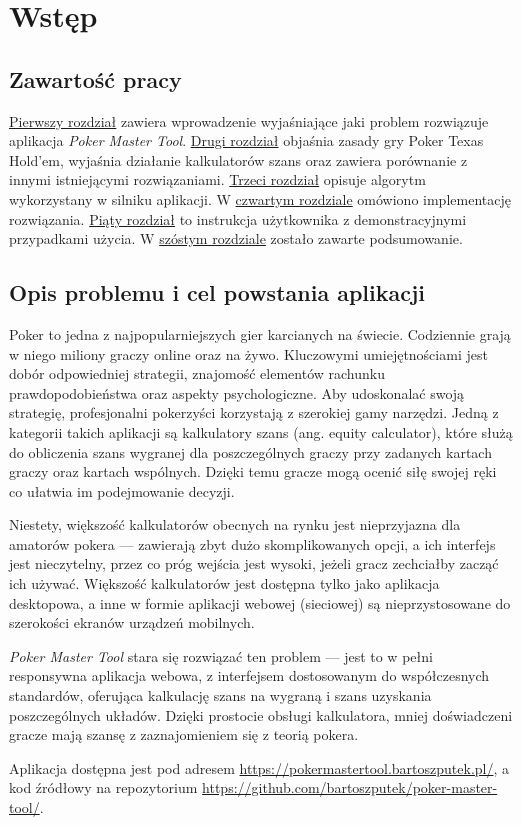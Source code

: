 \chapter{Wstęp}
\label{chapter:1}

\section{Zawartość pracy}

\hyperref[chapter:1]{Pierwszy rozdział} zawiera wprowadzenie wyjaśniające jaki problem rozwiązuje aplikacja \emph{Poker Master Tool}.
\hyperref[chapter:2]{Drugi rozdział} objaśnia zasady gry Poker Texas Hold’em, wyjaśnia działanie kalkulatorów szans oraz zawiera porównanie z innymi istniejącymi rozwiązaniami.
\hyperref[chapter:3]{Trzeci rozdział} opisuje algorytm wykorzystany w silniku aplikacji.
W \hyperref[chapter:4]{czwartym rozdziale} omówiono implementację rozwiązania.
\hyperref[chapter:5]{Piąty rozdział}  to instrukcja użytkownika z demonstracyjnymi przypadkami użycia.
W \hyperref[chapter:6]{szóstym rozdziale} zostało zawarte podsumowanie.

\section{Opis problemu i cel powstania aplikacji}

Poker \cite{wiki-poker} to jedna z najpopularniejszych gier karcianych na świecie. Codziennie grają w niego miliony graczy online oraz na żywo. Kluczowymi umiejętnościami jest dobór odpowiedniej strategii, znajomość elementów rachunku prawdopodobieństwa oraz aspekty psychologiczne. Aby udoskonalać swoją strategię, profesjonalni pokerzyści korzystają z szerokiej gamy narzędzi. Jedną z kategorii takich aplikacji są kalkulatory szans (ang. equity calculator), które służą do obliczenia szans wygranej dla poszczególnych graczy przy zadanych kartach graczy oraz kartach wspólnych. Dzięki temu gracze mogą ocenić siłę swojej ręki co ułatwia im podejmowanie decyzji.

Niestety, większość kalkulatorów obecnych na rynku jest nieprzyjazna dla amatorów pokera --- zawierają zbyt dużo skomplikowanych opcji, a ich interfejs jest nieczytelny, przez co próg wejścia jest wysoki, jeżeli gracz zechciałby zacząć ich używać. Większość kalkulatorów jest dostępna tylko jako aplikacja desktopowa, a inne w formie aplikacji webowej (sieciowej) są nieprzystosowane do szerokości ekranów urządzeń mobilnych. 

\emph{Poker Master Tool} stara się rozwiązać ten problem --- jest to w pełni responsywna aplikacja webowa, z interfejsem dostosowanym do współczesnych standardów, oferująca kalkulację szans na wygraną i szans uzyskania poszczególnych układów. Dzięki prostocie obsługi kalkulatora, mniej doświadczeni gracze mają szansę z zaznajomieniem się z teorią pokera. 

Aplikacja dostępna jest pod adresem \href{https://pokermastertool.bartoszputek.pl/}{https://pokermastertool.bartoszputek.pl/}, a kod źródłowy na repozytorium \href{https://github.com/bartoszputek/poker-master-tool/}{https://github.com/bartoszputek/poker-master-tool/}.
